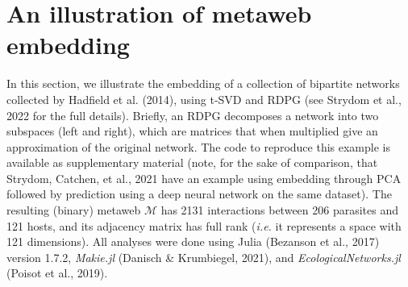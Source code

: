 \documentclass[10pt,oneside]{article}
\begin{document}
\hypertarget{an-illustration-of-metaweb-embedding}{%
\section{An illustration of metaweb
embedding}\label{an-illustration-of-metaweb-embedding}}

In this section, we illustrate the embedding of a collection of
bipartite networks collected by Hadfield et al. (2014), using t-SVD and
RDPG (see Strydom et al., 2022 for the full details). Briefly, an RDPG
decomposes a network into two subspaces (left and right), which are
matrices that when multiplied give an approximation of the original
network. The code to reproduce this example is available as
supplementary material (note, for the sake of comparison, that Strydom,
Catchen, et al., 2021 have an example using embedding through PCA
followed by prediction using a deep neural network on the same dataset).
The resulting (binary) metaweb \(\mathcal{M}\) has 2131 interactions
between 206 parasites and 121 hosts, and its adjacency matrix has full
rank (\emph{i.e.} it represents a space with 121 dimensions). All
analyses were done using Julia (Bezanson et al., 2017) version 1.7.2,
\emph{Makie.jl} (Danisch \& Krumbiegel, 2021), and
\emph{EcologicalNetworks.jl} (Poisot et al., 2019).
\end{document}
